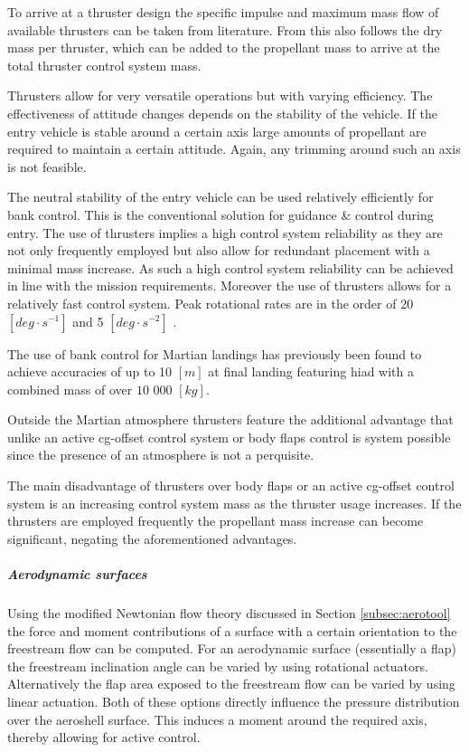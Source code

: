 To arrive at a thruster design the specific impulse and maximum mass flow of available thrusters can be taken from literature. From this also follows the dry mass per thruster, which can be added to the propellant mass to arrive at the total thruster control system mass.

Thrusters allow for very versatile operations but with varying efficiency. The effectiveness of attitude changes depends on the stability of the vehicle. If the entry vehicle is stable around a certain axis large amounts of propellant are required to maintain a certain attitude. Again, any trimming around such an axis is not feasible.

The neutral stability of the entry vehicle can be used relatively efficiently for bank control. This is the conventional solution for guidance \& control during entry. The use of thrusters implies a high control system reliability as they are not only frequently employed but also allow for redundant placement with a minimal mass increase. As such a high control system reliability can be achieved in line with the mission requirements. Moreover the use of thrusters allows for a relatively fast control system. Peak rotational rates are in the order of 20 $[deg\cdot s^{-1}]$ and 5 $[deg \cdot s^{-2}]$ \cite{Davis2010}.

The use of bank control for Martian landings has previously been found \cite{Davis2010} to achieve accuracies of up to 10 $[m]$ at final landing featuring \gls{hiad} with a combined mass of over $10$ $000$ $\left[kg\right]$.

Outside the Martian atmosphere thrusters feature the additional advantage that unlike an active \gls{cg}-offset control system or body flaps control is system possible since the presence of an atmosphere is not a perquisite.

The main disadvantage of thrusters over body flaps or an active \gls{cg}-offset control system is an increasing control system mass as the thruster usage increases. If the thrusters are employed frequently the propellant mass increase can become significant, negating the aforementioned advantages.


\subparagraph{Aerodynamic surfaces}

Using the modified Newtonian flow theory discussed in Section \ref{subsec:aerotool} the force and moment contributions of a surface with a certain orientation to the freestream flow can be computed. For an aerodynamic surface (essentially a flap) the freestream inclination angle can be varied by using rotational actuators. Alternatively the flap area exposed to the freestream flow can be varied by using linear actuation. Both of these options directly influence the pressure distribution over the aeroshell surface. This induces a moment around the required axis, thereby allowing for active control.

